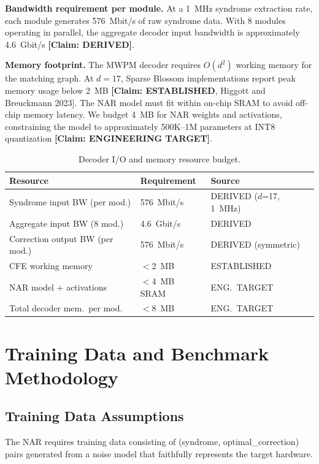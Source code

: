 \documentclass[conference]{IEEEtran}
\begin{document}
\textbf{Bandwidth requirement per module.} At a 1~MHz syndrome extraction rate, each module generates 576~Mbit/s of raw syndrome data. With 8 modules operating in parallel, the aggregate decoder input bandwidth is approximately 4.6~Gbit/s \textbf{[Claim: DERIVED]}.

\textbf{Memory footprint.} The MWPM decoder requires $O(d^2)$ working memory for the matching graph. At $d = 17$, Sparse Blossom implementations report peak memory usage below 2~MB \textbf{[Claim: ESTABLISHED}, Higgott and Breuckmann 2023]. The NAR model must fit within on-chip SRAM to avoid off-chip memory latency. We budget 4~MB for NAR weights and activations, constraining the model to approximately 500K--1M parameters at INT8 quantization \textbf{[Claim: ENGINEERING TARGET]}.

\begin{table}[H]
\centering
\caption{Decoder I/O and memory resource budget.}
\label{tab:io-budget}
\footnotesize
\begin{tabularx}{\columnwidth}{L{3.2cm}L{2.5cm}l}
\toprule
\textbf{Resource} & \textbf{Requirement} & \textbf{Source} \\
\midrule
Syndrome input BW (per mod.) & 576~Mbit/s & DERIVED ($d$=17, 1~MHz) \\
Aggregate input BW (8 mod.) & 4.6~Gbit/s & DERIVED \\
Correction output BW (per mod.) & 576~Mbit/s & DERIVED (symmetric) \\
CFE working memory & $<$2~MB & ESTABLISHED \\
NAR model + activations & $<$4~MB SRAM & ENG.\ TARGET \\
Total decoder mem.\ per mod. & $<$8~MB & ENG.\ TARGET \\
\bottomrule
\end{tabularx}
\end{table}

\section{Training Data and Benchmark Methodology}

\subsection{Training Data Assumptions}

The NAR requires training data consisting of (syndrome, optimal\_correction) pairs generated from a noise model that faithfully represents the target hardware.
\end{document}
